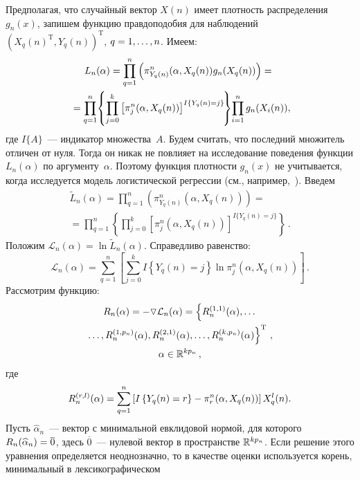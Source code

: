 \begin{multicols}{2}
Предполагая, что случайный вектор $X(n)$ имеет плотность распределения $g_n(x)$, 
запишем функцию правдоподобия для наблюдений 
$(X_q(n)^{\mathrm{T}},Y_q(n))^{\mathrm{T}}$, $q\hm=1,\ldots,n$. Имеем:
\begin{multline*}
L_n(\alpha)=\prod\limits_{q=1}^{n}\left(\pi^n_{Y_q(n)}(\alpha,X_q(n))g_n(X_q(n))\right)={}\\
\hspace*{-2pt}{}=
\prod\limits_{q=1}^n\!\left\{\prod\limits_{j=0}^k\left[\pi^n_{j}(\alpha ,X_q(n))\right]^{I\{Y_q(n)=
j\}}\!\right\}\!\prod\limits_{i=1}^ng_n(X_i(n)),\hspace*{-4.07253pt}
\end{multline*}
где $I\{A\}$~--- индикатор множества~$A$. Будем считать, что последний множитель отличен 
от нуля. Тогда он никак не повлияет на исследование поведения функции $L_n(\alpha)$ по 
аргументу~$\alpha$. Поэтому функция плотности $g_n(x)$ не учитывается, когда исследуется 
модель логистической регрессии (см., например,~\cite{Gramacy}). Введем
\begin{multline*}
\widetilde{L}_n(\alpha)=\prod\limits_{q=1}^{n}
\left(\pi^n_{Y_q(n)}(\alpha, X_q(n))\right)={}\\
{}=
\prod\limits_{q=1}^n\left\{\prod\limits_{j=0}^k\left[\pi^n_{j}(\alpha, X_q(n))\right]^{I\{Y_q(n)
=j\}}\right\}\,.
\end{multline*}
Положим $\mathcal{L}_n(\alpha)=\ln \widetilde{L}_n(\alpha)$. Справедливо равенство:
\begin{equation*}
\mathcal{L}_n(\alpha)=\sum\limits_{q=1}^n\left[\sum\limits_{j=0}^k I\left\{Y_q(n)=j\right\}
\ln\pi^n_j(\alpha, X_q(n))\right]\,.
\label{Ln}
\end{equation*}
Рассмотрим функцию:
\begin{multline*}
R_n(\alpha)=-\triangledown\mathcal{L}_n(\alpha)=
\left\{R_n^{(1,1)}(\alpha),\ldots\right.\\
\left.\ldots , R_n^{(1,p_n)}(\alpha),R_n^{(2,1)}(\alpha),\ldots,
R_n^{(k,p_n)}(\alpha)\right\}^{\mathrm{T}}\,, \\ \alpha\in\mathbb R^{kp_n}\,,
\end{multline*}
где 
$$
R_n^{(r,l)}(\alpha)\hm=\sum\limits_{q=1}^n\left[
I\left\{Y_q(n)=r\right\}-\pi^n_r(\alpha, X_q(n))\right]X_q^l(n).
$$ 
Пусть 
$\widehat{\alpha}_n$~--- вектор с минимальной евклидовой нормой, для 
которого $R_n(\widehat{\alpha}_n)\hm=\overline{0}$, здесь $\overline{0}$~--- 
нулевой вектор в пространстве $\mathbb R^{kp_n}$. Если решение этого уравнения определяется 
неоднозначно, то в качестве оценки используется корень, минимальный в лексикографическом 

\end{multicols}
